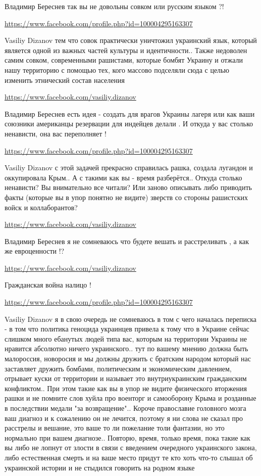 \documentclass[a4paper,11pt]{extreport}
\begin{document}
\begin{itemize}
\begin{itemize}
Владимир Береснев так вы не довольны совком или русским языком ?!

\url{https://www.facebook.com/profile.php?id=100004295163307}

Vasiliy Dizanov тем что совок практически уничтожил украинский язык, который является одной из важных частей культуры и идентичности..
Также недоволен самим совком, современными рашистами, которые бомбят Украину и отжали нашу территорию с помощью тех, кого массово подселяли сюда с целью изменить этнический состав населения

\url{https://www.facebook.com/vasiliy.dizanov}

Владимир Береснев есть идея - создать для врагов Украины лагеря или как ваши союзники американцы резервации для индейцев делали . И откуда у вас столько ненависти, она вас переполняет !

\url{https://www.facebook.com/profile.php?id=100004295163307}

Vasiliy Dizanov с этой задачей прекрасно справилась рашка, создала лугандон и оккупировала Крым..
А с такими как вы - время разберётся..
Откуда столько ненависти?
Вы внимательно все читали? Или заново описывать либо приводить факты (которые вы в упор понятно не видите) зверств со стороны рашистских войск и коллаборантов?

\url{https://www.facebook.com/vasiliy.dizanov}

Владимир Береснев я не сомневаюсь что будете вешать и расстреливать , а как же евроценности !?

\url{https://www.facebook.com/vasiliy.dizanov}

Гражданская война налицо !

\url{https://www.facebook.com/profile.php?id=100004295163307}

Vasiliy Dizanov я в свою очередь не сомневаюсь в том с чего началась переписка - в том что политика геноцида украинцев привела к тому что в Украине сейчас слишком много ебанутых людей типа вас, которым на территории Украины не нравится абсолютно ничего украинского.. тут по вашему мнению должна быть малороссия, новоросия и мы должны дружить с братским народом который нас заставляет дружить бомбами, политическим и экономическим давлением, отрывает куски от территории и называет это внутриукраинским гражданским конфликтом..
При этом такие как вы в упор не видите физического вторжения рашки и не помните слов хуйла про военторг и самооборону Крыма и розданные в последствии медали "за возвращение"..
Короче православие головного мозга ваш диагноз и к сожалению он не лечится, поэтому я ни слова не сказал про расстрелы и вешание, это ваше то ли пожелание толи фантазии, но это нормально при вашем диагнозе..
Повторю, время, только время, пока такие как вы либо не лопнут от злости в связи с введением очередного украинского закона, либо естественная смерть и на ваше место придут те кто хоть что-то слышал об украинской истории и не стыдился говорить на родном языке


\end{itemize}
\end{itemize}
\end{document}
